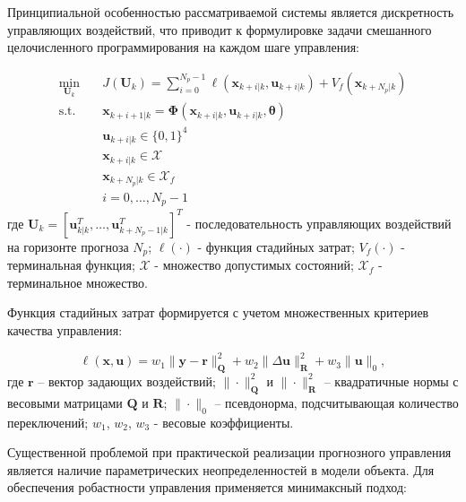Принципиальной особенностью рассматриваемой системы является дискретность управляющих воздействий,
что приводит к формулировке задачи смешанного целочисленного программирования на каждом шаге управления:

\begin{equation}
	\begin{aligned}
		\min_{\mathbf{U}_k} \quad & J(\mathbf{U}_k) = \sum_{i=0}^{N_p-1} \ell(\mathbf{x}_{k+i|k}, \mathbf{u}_{k+i|k}) + V_f(\mathbf{x}_{k+N_p|k}) \\
		\text{s.t.} \quad         & \mathbf{x}_{k+i+1|k} = \boldsymbol{\Phi}(\mathbf{x}_{k+i|k}, \mathbf{u}_{k+i|k}, \boldsymbol{\theta})         \\
		                          & \mathbf{u}_{k+i|k} \in \{0,1\}^4                                                                              \\
		                          & \mathbf{x}_{k+i|k} \in \mathcal{X}                                                                            \\
		                          & \mathbf{x}_{k+N_p|k} \in \mathcal{X}_f                                                                        \\
		                          & i = 0,\ldots,N_p-1
	\end{aligned}
\end{equation}
где $\mathbf{U}_k = [\mathbf{u}_{k|k}^T, \ldots, \mathbf{u}_{k+N_p-1|k}^T]^T$ - последовательность управляющих воздействий на горизонте прогноза $N_p$;
$\ell(\cdot)$ - функция стадийных затрат;
$V_f(\cdot)$ - терминальная функция;
$\mathcal{X}$ - множество допустимых состояний;
$\mathcal{X}_f$ - терминальное множество.

Функция стадийных затрат формируется с учетом множественных критериев качества управления:

\begin{equation}
	\ell(\mathbf{x}, \mathbf{u}) = w_1\|\mathbf{y} - \mathbf{r}\|_{\mathbf{Q}}^2 + w_2\|\Delta\mathbf{u}\|_{\mathbf{R}}^2 + w_3\|\mathbf{u}\|_0,
\end{equation}
где $\mathbf{r}$ -- вектор задающих воздействий;
$\|\cdot\|_{\mathbf{Q}}^2$ и $\|\cdot\|_{\mathbf{R}}^2$ -- квадратичные нормы с весовыми матрицами $\mathbf{Q}$ и $\mathbf{R}$;
$\|\cdot\|_0$ -- псевдонорма, подсчитывающая количество переключений;
$w_1$, $w_2$, $w_3$ - весовые коэффициенты.

Существенной проблемой при практической реализации прогнозного управления является наличие параметрических неопределенностей
в модели объекта. Для обеспечения робастности управления применяется минимаксный подход:

